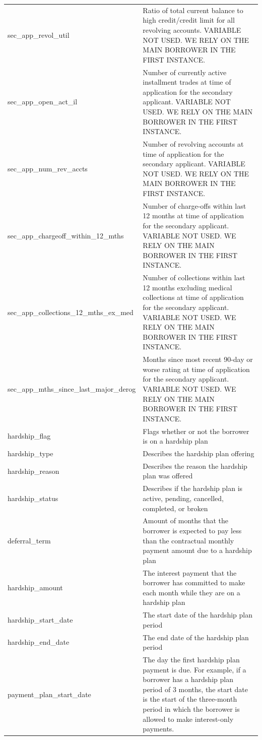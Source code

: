 \documentclass[11pt,]{report}
\begin{document}
\begin{longtable}[t]{>{\raggedright\arraybackslash}p{7cm}>{\raggedright\arraybackslash}p{7cm}}
\addlinespace
sec\_app\_revol\_util & Ratio of total current balance to high credit/credit limit for all revolving accounts. VARIABLE NOT USED. WE RELY ON THE MAIN BORROWER IN THE FIRST INSTANCE.\\
sec\_app\_open\_act\_il & Number of currently active installment trades at time of application for the secondary applicant. VARIABLE NOT USED. WE RELY ON THE MAIN BORROWER IN THE FIRST INSTANCE.\\
sec\_app\_num\_rev\_accts & Number of revolving accounts at time of application for the secondary applicant. VARIABLE NOT USED. WE RELY ON THE MAIN BORROWER IN THE FIRST INSTANCE.\\
sec\_app\_chargeoff\_within\_12\_mths & Number of charge-offs within last 12 months at time of application for the secondary applicant. VARIABLE NOT USED. WE RELY ON THE MAIN BORROWER IN THE FIRST INSTANCE.\\
sec\_app\_collections\_12\_mths\_ex\_med & Number of collections within last 12 months excluding medical collections at time of application for the secondary applicant. VARIABLE NOT USED. WE RELY ON THE MAIN BORROWER IN THE FIRST INSTANCE.\\
\addlinespace
sec\_app\_mths\_since\_last\_major\_derog & Months since most recent 90-day or worse rating at time of application for the secondary applicant. VARIABLE NOT USED. WE RELY ON THE MAIN BORROWER IN THE FIRST INSTANCE.\\
hardship\_flag & Flags whether or not the borrower is on a hardship plan\\
hardship\_type & Describes the hardship plan offering\\
hardship\_reason & Describes the reason the hardship plan was offered\\
hardship\_status & Describes if the hardship plan is active, pending, cancelled, completed, or broken\\
\addlinespace
deferral\_term & Amount of months that the borrower is expected to pay less than the contractual monthly payment amount due to a hardship plan\\
hardship\_amount & The interest payment that the borrower has committed to make each month while they are on a hardship plan\\
hardship\_start\_date & The start date of the hardship plan period\\
hardship\_end\_date & The end date of the hardship plan period\\
payment\_plan\_start\_date & The day the first hardship plan payment is due. For example, if a borrower has a hardship plan period of 3 months, the start date is the start of the three-month period in which the borrower is allowed to make interest-only payments.\\

\end{longtable}
\end{document}
